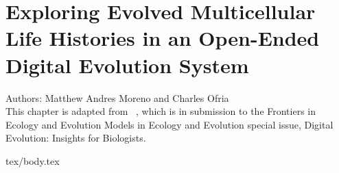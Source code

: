 \chapter{Exploring Evolved Multicellular Life Histories in an Open-Ended Digital Evolution System}
\label{ch:case-studies}

\noindent
Authors: Matthew Andres Moreno and Charles Ofria \\
This chapter is adapted from ~\citep{moreno2021exploring}, which is in submission to the Frontiers in Ecology and Evolution
Models in Ecology and Evolution special issue, Digital Evolution: Insights for Biologists.

{tex/body.tex}
